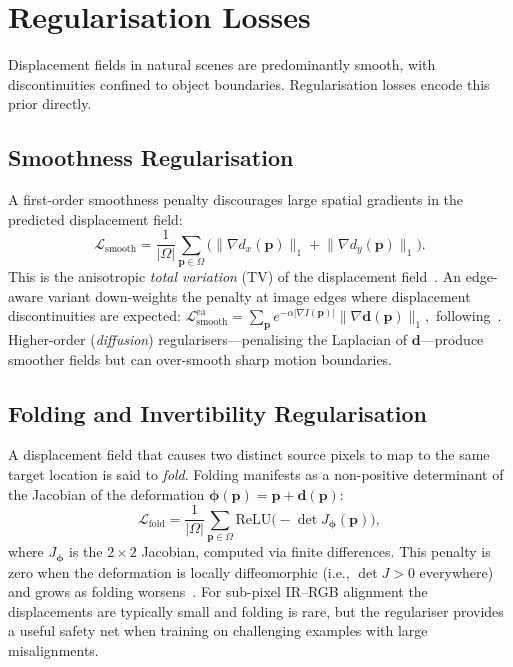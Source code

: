 \section{Regularisation Losses}
\label{sec:regularisation}

Displacement fields in natural scenes are predominantly smooth, with
discontinuities confined to object boundaries.  Regularisation losses encode
this prior directly.

\subsection{Smoothness Regularisation}
\label{ssec:smooth}

A first-order smoothness penalty discourages large spatial gradients in the
predicted displacement field:
%
\begin{equation}
  \mathcal{L}_{\text{smooth}}
  = \frac{1}{|\Omega|}\sum_{\mathbf{p}\in\Omega}
    \bigl( \lVert \nabla d_x(\mathbf{p}) \rVert_{1}
         + \lVert \nabla d_y(\mathbf{p}) \rVert_{1} \bigr).
  \label{eq:smooth}
\end{equation}
%
This is the anisotropic \emph{total variation} (TV) of the displacement
field~\cite{rudin1992tv}.  An edge-aware variant down-weights the penalty at
image edges where displacement discontinuities are expected:
$\mathcal{L}_{\text{smooth}}^{\text{ea}} = \sum_{\mathbf{p}}
  e^{-\alpha |\nabla I(\mathbf{p})|}
  \lVert \nabla \mathbf{d}(\mathbf{p}) \rVert_{1},$
following~\citet{godard2017monodepth}.  Higher-order (\emph{diffusion})
regularisers---penalising the Laplacian of $\mathbf{d}$---produce smoother
fields but can over-smooth sharp motion boundaries.

\subsection{Folding and Invertibility Regularisation}
\label{ssec:folding}

A displacement field that causes two distinct source pixels to map to the same
target location is said to \emph{fold}.  Folding manifests as a non-positive
determinant of the Jacobian of the deformation $\boldsymbol{\phi}(\mathbf{p})
= \mathbf{p} + \mathbf{d}(\mathbf{p})$:
%
\begin{equation}
  \mathcal{L}_{\text{fold}}
  = \frac{1}{|\Omega|}\sum_{\mathbf{p}\in\Omega}
    \text{ReLU}\!\bigl(-\det J_{\boldsymbol{\phi}}(\mathbf{p})\bigr),
  \label{eq:fold}
\end{equation}
%
where $J_{\boldsymbol{\phi}}$ is the $2\times 2$ Jacobian, computed via
finite differences.  This penalty is zero when the deformation is locally
diffeomorphic (i.e., $\det J > 0$ everywhere) and grows as folding
worsens~\cite{dalca2019unsupervised}.  For sub-pixel IR--RGB alignment the
displacements are typically small and folding is rare, but the regulariser
provides a useful safety net when training on challenging examples with large
misalignments.

